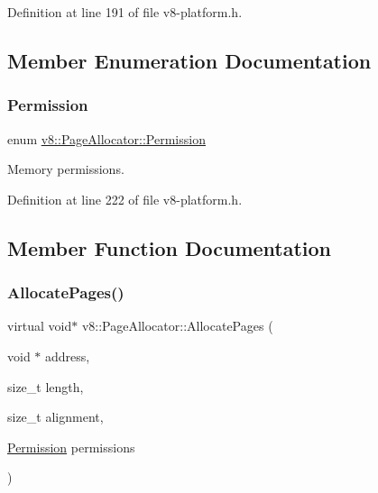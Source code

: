 Definition at line 191 of file v8-\/platform.\+h.



\subsection{Member Enumeration Documentation}
\mbox{\label{classv8_1_1PageAllocator_a88f74b164fe97e053259f67a95758415}} 
\subsubsection{\texorpdfstring{Permission}{Permission}}
{\footnotesize\ttfamily enum \mbox{\hyperlink{classv8_1_1PageAllocator_a88f74b164fe97e053259f67a95758415}{v8\+::\+Page\+Allocator\+::\+Permission}}}

Memory permissions. 

Definition at line 222 of file v8-\/platform.\+h.



\subsection{Member Function Documentation}
\mbox{\label{classv8_1_1PageAllocator_ab3a25ddd2601701f80ee67c4bf017ef7}} 
\subsubsection{\texorpdfstring{Allocate\+Pages()}{AllocatePages()}}
{\footnotesize\ttfamily virtual void$\ast$ v8\+::\+Page\+Allocator\+::\+Allocate\+Pages (\begin{DoxyParamCaption}\item[{void $\ast$}]{address,  }\item[{size\+\_\+t}]{length,  }\item[{size\+\_\+t}]{alignment,  }\item[{\mbox{\hyperlink{classv8_1_1PageAllocator_a88f74b164fe97e053259f67a95758415}{Permission}}}]{permissions }\end{DoxyParamCaption})\hspace{0.3cm}{\ttfamily [pure virtual]}}

